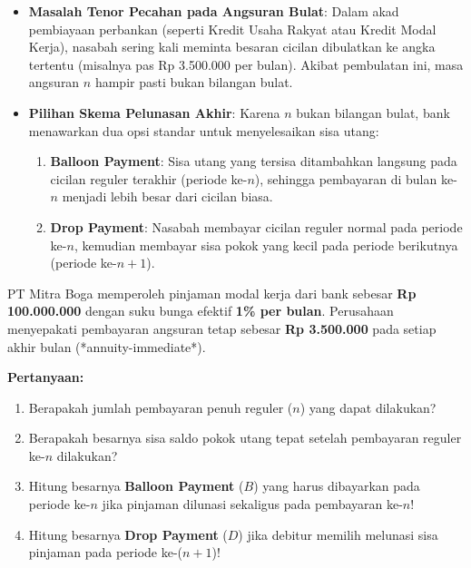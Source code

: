 \documentclass[11pt,a4paper]{article}
\begin{document}
\begin{kasusbox}
\begin{itemize}[leftmargin=4mm, topsep=1pt, itemsep=1pt]
    \item \textbf{Masalah Tenor Pecahan pada Angsuran Bulat}: Dalam akad pembiayaan perbankan (seperti Kredit Usaha Rakyat atau Kredit Modal Kerja), nasabah sering kali meminta besaran cicilan dibulatkan ke angka tertentu (misalnya pas Rp 3.500.000 per bulan). Akibat pembulatan ini, masa angsuran $n$ hampir pasti bukan bilangan bulat.
    \item \textbf{Pilihan Skema Pelunasan Akhir}: Karena $n$ bukan bilangan bulat, bank menawarkan dua opsi standar untuk menyelesaikan sisa utang:
    \begin{enumerate}[label=\arabic*., leftmargin=5mm]
        \item \textbf{Balloon Payment}: Sisa utang yang tersisa ditambahkan langsung pada cicilan reguler terakhir (periode ke-$n$), sehingga pembayaran di bulan ke-$n$ menjadi lebih besar dari cicilan biasa.
        \item \textbf{Drop Payment}: Nasabah membayar cicilan reguler normal pada periode ke-$n$, kemudian membayar sisa pokok yang kecil pada periode berikutnya (periode ke-$n+1$).
    \end{enumerate}
\end{itemize}
\end{kasusbox}

\begin{soalbox}
PT Mitra Boga memperoleh pinjaman modal kerja dari bank sebesar \textbf{Rp 100.000.000} dengan suku bunga efektif \textbf{1\% per bulan}. Perusahaan menyepakati pembayaran angsuran tetap sebesar \textbf{Rp 3.500.000} pada setiap akhir bulan (*annuity-immediate*).

\textbf{Pertanyaan:}
\begin{enumerate}[label=(\alph*), topsep=1pt, itemsep=1pt]
    \item Berapakah jumlah pembayaran penuh reguler ($n$) yang dapat dilakukan?
    \item Berapakah besarnya sisa saldo pokok utang tepat setelah pembayaran reguler ke-$n$ dilakukan?
    \item Hitung besarnya \textbf{Balloon Payment} ($B$) yang harus dibayarkan pada periode ke-$n$ jika pinjaman dilunasi sekaligus pada pembayaran ke-$n$!
    \item Hitung besarnya \textbf{Drop Payment} ($D$) jika debitur memilih melunasi sisa pinjaman pada periode ke-($n+1$)!
\end{enumerate}
\end{soalbox}
\end{document}
